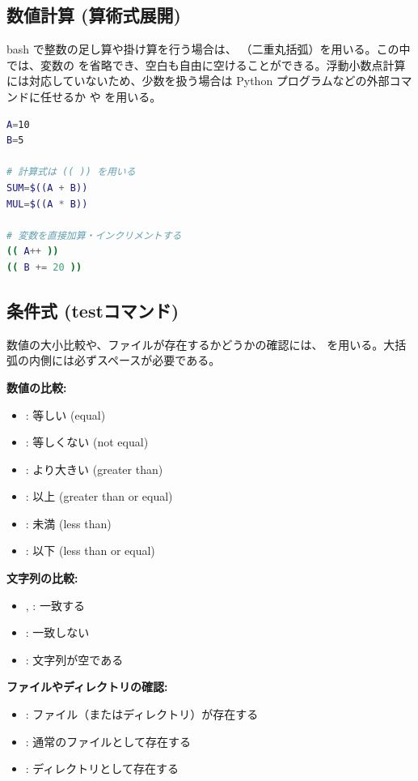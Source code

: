 \subsection{数値計算 (算術式展開)}

bash で整数の足し算や掛け算を行う場合は、\code{(( ))} （二重丸括弧）を用いる。この中では、変数の \code{\$} を省略でき、空白も自由に空けることができる。浮動小数点計算には対応していないため、少数を扱う場合は Python プログラムなどの外部コマンドに任せるか  や  を用いる。

\begin{lstlisting}[language=bash]
A=10
B=5

# 計算式は (( )) を用いる
SUM=$((A + B))
MUL=$((A * B))

# 変数を直接加算・インクリメントする
(( A++ ))
(( B += 20 ))
\end{lstlisting}

\subsection{条件式 (testコマンド)}

数値の大小比較や、ファイルが存在するかどうかの確認には、\code{[ ]} を用いる。大括弧の内側には必ずスペースが必要である。

\textbf{数値の比較:}
\begin{itemize}
    \item {}: 等しい (equal)
    \item {}: 等しくない (not equal)
    \item {}: より大きい (greater than)
    \item {}: 以上 (greater than or equal)
    \item {}: 未満 (less than)
    \item {}: 以下 (less than or equal)
\end{itemize}

\textbf{文字列の比較:}
\begin{itemize}
    \item \code{=}, \code{==}: 一致する
    \item \code{!=}: 一致しない
    \item {}: 文字列が空である
\end{itemize}

\textbf{ファイルやディレクトリの確認:}
\begin{itemize}
    \item {}: ファイル（またはディレクトリ）が存在する
    \item {}: 通常のファイルとして存在する
    \item {}: ディレクトリとして存在する
\end{itemize}

